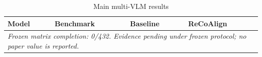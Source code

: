 \begin{table}[t]
\centering
\caption{Main multi-VLM results}
\begin{tabular}{llll}
\toprule
Model & Benchmark & Baseline & ReCoAlign \\
\midrule
\multicolumn{4}{l}{\textit{Frozen matrix completion: 0/432. Evidence pending under frozen protocol; no paper value is reported.}} \\
\bottomrule
\end{tabular}
\end{table}
